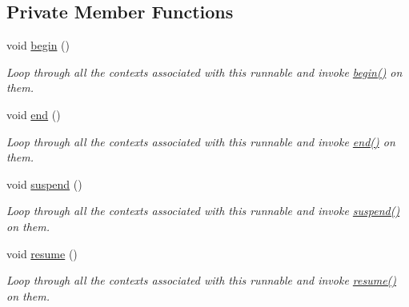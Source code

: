 \subsection*{Private Member Functions}
\begin{DoxyCompactItemize}
\item 
void \hyperlink{structvt_1_1runnable_1_1_runnable_new_a045c7de03d22865a65dbfac4c51ae1e0}{begin} ()
\begin{DoxyCompactList}\small\item\em Loop through all the contexts associated with this runnable and invoke {\ttfamily \hyperlink{structvt_1_1runnable_1_1_runnable_new_a045c7de03d22865a65dbfac4c51ae1e0}{begin()}} on them. \end{DoxyCompactList}\item 
void \hyperlink{structvt_1_1runnable_1_1_runnable_new_a068c32bc50b8754909aad6d2464e3cc8}{end} ()
\begin{DoxyCompactList}\small\item\em Loop through all the contexts associated with this runnable and invoke {\ttfamily \hyperlink{structvt_1_1runnable_1_1_runnable_new_a068c32bc50b8754909aad6d2464e3cc8}{end()}} on them. \end{DoxyCompactList}\item 
void \hyperlink{structvt_1_1runnable_1_1_runnable_new_aaeb0fefa5654a01600da2e0910f69ca7}{suspend} ()
\begin{DoxyCompactList}\small\item\em Loop through all the contexts associated with this runnable and invoke {\ttfamily \hyperlink{structvt_1_1runnable_1_1_runnable_new_aaeb0fefa5654a01600da2e0910f69ca7}{suspend()}} on them. \end{DoxyCompactList}\item 
void \hyperlink{structvt_1_1runnable_1_1_runnable_new_a4d38f8f4d413457a40f134a57480449d}{resume} ()
\begin{DoxyCompactList}\small\item\em Loop through all the contexts associated with this runnable and invoke {\ttfamily \hyperlink{structvt_1_1runnable_1_1_runnable_new_a4d38f8f4d413457a40f134a57480449d}{resume()}} on them. \end{DoxyCompactList}\end{DoxyCompactItemize}
